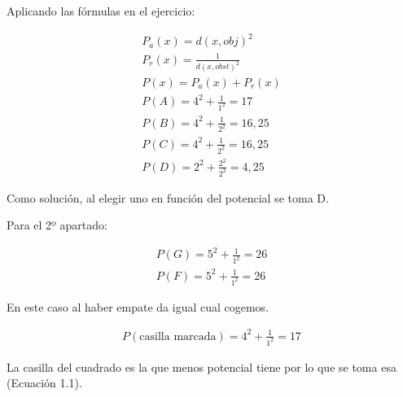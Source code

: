 Aplicando las fórmulas en el ejercicio:

\begin{align*}
    P_a(x) = d(x,obj)^2 \\
    P_r(x) = \frac{1}{d(x,obst)^2} \\
    P(x) = P_a(x)+P_r(x) \\
    P(A) = 4^2 +  \frac{1}{1^2} = 17\\
    P(B) = 4^2 + \frac{1}{2^2} = 16,25\\
    P(C) = 4^2 + \frac{1}{2^2} = 16,25\\
    P(D) = 2^2 + \frac{2^2}{2^2} = 4,25
\end{align*}

Como solución, al elegir uno en función del potencial se toma D.

Para el 2º apartado:

\begin{align*}
    P(G) = 5^2+ \frac{1}{1^2} = 26 \\
    P(F) = 5^2+ \frac{1}{1^2} = 26
\end{align*}

En este caso al haber empate da igual cual cogemos.

\begin{align}
    P(\text{casilla marcada}) = 4^2 + \frac{1}{1^2} = 17
\end{align}

La casilla del cuadrado es la que menos potencial tiene por lo que se toma esa (Ecuación 1.1).

